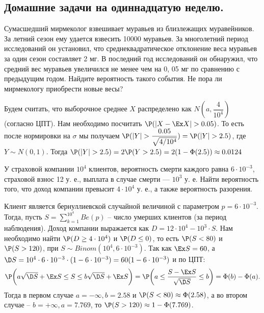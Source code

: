 \subsection{Домашние задачи на одиннадцатую неделю.}
\begin{problem}
    Сумасшедший мирмеколог взвешивает муравьев из близлежащих муравейников.
    За летний сезон ему удается взвесить 10000 муравьев.
    За многолетний период исследований он установил, что среднеквадратическое отклонение веса муравьев за один сезон составляет 2 мг.
    В последний год исследований он обнаружил, что средний вес муравьев увеличился не менее чем на 0, 05 мг по сравнению с предыдущим годом.
    Найдите вероятность такого события.
    Не пора ли мирмекологу приобрести новые весы?
\end{problem}
\begin{solution}
    Будем считать, что выборочное среднее $X$ распределено как $N(a, \dfrac{4}{10^4})$ (согласно ЦПТ).
    Нам необходимо посчитать $\P(|X - \Ex X| > 0.05)$.
    То есть после нормировки на $\sigma$ мы получаем $\P(|Y| > \dfrac{0.05}{\sqrt {4/10^4}}) = \P(|Y| > 2.5)$, где $Y \sim N(0, 1)$.
    Тогда $\P(|Y| > 2.5) = 2\P(Y > 2.5) = 2(1 - \Phi(2.5)) \approx 0.0124$
\end{solution}
\begin{problem}
    У страховой компании $10^4$ клиентов, вероятность смерти каждого равна $6 \cdot 10^{-3}$, страховой взнос 12 у. е., выплата в случае смерти — $10^3$ у. е.
    Найти вероятность того, что доход компании превысит $4 \cdot 10^4$ у. е., а также вероятность разорения.
\end{problem}
\begin{solution}
    Клиент является бернуллиевской случайной величиной с параметром $p = 6 \cdot 10^{-3}$.
    Тогда, пусть $S = \sum\limits_{k = 1}^{10^4} Be(p)$ -- число умерших клиентов (за период наблюдения).
    Доход компании выражается как $D = 12 \cdot 10^{4} - 10^3 \cdot S$.
    Нам необходимо найти $\P(D \geq 4 \cdot 10^4)$ и $\P(D \leq 0)$, то есть $\P(S < 80)$ и $\P(S > 120)$, при $S \sim Binom(10^{4}, 6 \cdot 10^{-3})$.
    Так как $\Ex S = 60$, а $\D S = 10^{4} \cdot 6 \cdot 10^{-3} \cdot (1 - 6 \cdot 10^{-3}) = 60(1 - 6 \cdot 10^{-3})$ и по ЦПТ:
    \[
        \P\biggr(a\sqrt {\D S} + \Ex S \leq S \leq b\sqrt {\D S} + \Ex S\biggr) = \P\biggr(a \leq \dfrac{S - \Ex S}{\sqrt{\D S}} \leq b\biggr) = \Phi(b) - \Phi(a).
    \]
    Тогда в первом случае $a = -\infty, b = 2.58$ и $\P(S < 80) \approx \Phi(2.58)$, а во втором случае -- $b = +\infty, a = 7.769$, то $\P(S > 120) \approx 1 - \Phi(7.769)$.
\end{solution}
